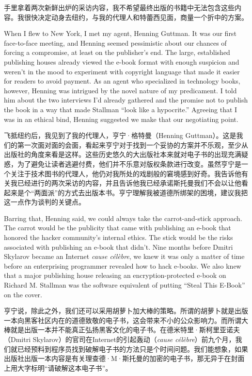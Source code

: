 \ifdefined\chs
手里拿着两次新鲜出炉的采访内容，我不希望最终出版的书籍中无法包含这些内容。我很快决定动身去纽约，与我的代理人和特蕾西见面，商量一个折中的方案。
\fi

\ifdefined\eng
When I flew to New York, I met my agent, Henning Guttman. It was our first face-to-face meeting, and Henning seemed pessimistic about our chances of forcing a compromise, at least on the publisher's end. The large, established publishing houses already viewed the e-book format with enough suspicion and weren't in the mood to experiment with copyright language that made it easier for readers to avoid payment. As an agent who specialized in technology books, however, Henning was intrigued by the novel nature of my predicament. I told him about the two interviews I'd already gathered and the promise not to publish the book in a way that made Stallman ``look like a hypocrite.'' Agreeing that I was in an ethical bind, Henning suggested we make that our negotiating point.
\fi

\ifdefined\chs
飞抵纽约后，我见到了我的代理人，亨宁·格特曼（Henning Guttman）。这是我们的第一次面对面的会面，看起来亨宁对于找到一个妥协的方案并不乐观，至少从出版社的角度来看是这样。这些历史悠久的大出版社本来就对电子书的出现充满疑惑，为了避免让读者逃避付费，他们并不乐意对版权条款进行改变。虽然亨宁是一个关注于技术图书的代理人，他仍对我所处的戏剧般的窘境感到好奇。我告诉他有关我已经进行的两次采访的内容，并且告诉他我已经承诺斯托曼我们不会以让他看起来是个``两面派''的方式去出版本书。亨宁理解我被道德所绑架的困境，建议我把这一点作为谈判的关键点。
\fi

\ifdefined\eng
Barring that, Henning said, we could always take the carrot-and-stick approach. The carrot would be the publicity that came with publishing an e-book that honored the hacker community's internal ethics. The stick would be the risks associated with publishing an e-book that didn't. Nine months before Dmitri Skylarov became an Internet \textit{cause célèbre}, we knew it was only a matter of time before an enterprising programmer revealed how to hack e-books. We also knew that a major publishing house releasing an encryption-protected e-book on Richard M. Stallman was the software equivalent of putting ``Steal This E-Book'' on the cover.
\fi

\ifdefined\chs
亨宁说，除此之外，我们还可以采用胡萝卜加大棒的策略。所谓的胡萝卜就是出版一本向黑客社区内在的道德致敬的电子书，这会带来不小的公众影响力。而所谓大棒就是出版一本并不能真正弘扬黑客文化的电子书。在德米特里·斯柯里亚诺夫（Dmitri Skylarov）的官司在Internet的引起轰动（\textit{cause célèbre}）前九个月，我们就已经预料到程序员找到破解电子书的方法只是个时间问题。我们能想象，如果出版社出版一本内容是有关理查德·M·斯托曼的加密的电子书，那无异于在封面上用大字标明``请破解这本电子书''。
\fi

